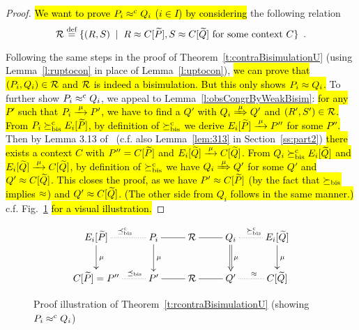 \begin{proof}
\hl{We want to prove $P_i \mathrel{\approx^{\rm{c}}} Q_i$ ($i \in I$) by considering}
the following relation
\begin{equation*}
{\cal R} \stackrel{\mbox{\scriptsize def}}{=} \{(R,S) \; \mid \; R \approx C [\widetilde P], S \approx C [\widetilde Q] \mbox{~for some context
$C$} \} \enspace.
\end{equation*}

Following the same steps in the proof of
Theorem~\ref{t:contraBisimulationU}
(using Lemma~\ref{l:ruptocon}
in place of Lemma~\ref{l:uptocon}), \hl{we can prove that $(P_i, Q_i)
\in{\cal R}$ and ${\cal R}$ is indeed a bisimulation. But this only shows $P_i \approx Q_i$.}
%
To further show $P_i \mathrel{\approx^{\rm{c}}} Q_i$, we appeal to
Lemma~\ref{l:obsCongrByWeakBisim}: \hl{for any $P'$ such that $P_i \arr{\mu} P'$, we have to
  find a $Q'$ with $Q_i \Arr{\mu} Q'$ and $(R',S') \in {\cal R}$.
%
From $P_i \mathrel{\succeq^{\rm{c}}_{\rm{bis}}} E_i[{\widetilde P}]$, by definition of $\mathrel{\succeq^{\rm{c}}_{\rm{bis}}}$ we derive $E_i[{\til P}] \arr{\mu}
P''$ for some $P''$.} Then by Lemma 3.13 of~\citep[p.~102]{Mil89}
(c.f. also Lemma~\ref{lem:313} in Section~\ref{ss:part2}) \hl{there exists
a context
$C$ with $P'' = C[{\widetilde P}]$ and $E_i[{\til Q}] \arr{\mu} C[{\til Q}]$.
From $Q_i \mathrel{\succeq^{\rm{c}}_{\rm{bis}}} E_i[{\widetilde Q}]$ and $E_i[{\til Q}] \arr{\mu} C[{\til
  Q}]$, by definition of $\mathrel{\succeq^{\rm{c}}_{\rm{bis}}}$ we have $Q_i \Arr{\mu} Q'$ for some
$Q'$ and $Q' \approx C[{\widetilde Q}]$. This closes the proof, as we have
$P' \approx C[{\widetilde P}]$ (by the fact that $\mathrel{\succeq_{\rm{bis}}}$ implies $\approx$) and
$Q' \approx C[{\widetilde Q}]$. (The other side from $Q_i$ follows in the same manner.)}
c.f. Fig.~\ref{fig:314} \hl{for a visual illustration.}
\end{proof}

\begin{figure}[ht]
\begin{displaymath}
  \xymatrix{
    {E_i[{\til P}]} \ar@{.}[r]^{\preceq^{\mathrm{c}}_{\mathrm{bis}}} \ar@{->}[d]^{\mu} & {P_i} \ar@{-}[r]
    \ar@{->}[d]^{\mu} & {\R} \ar@{-}[r] & {Q_i} \ar@{.}[r]^{\rcontr}
    \ar@{=>}[d]^{\mu} & {E_i[{\til Q}]} \ar@{->}[d]^{\mu} \\
    {C[{\til P}] = P''} \ar@{.}[r]^{\qquad\preceq_{\mathrm{bis}}} & {P'} \ar@{-}[r] & {\R} \ar@{-}[r] & {Q'} \ar@{.}[r]^{\wb} 
    & {C[{\til Q}]} \\
  }
\end{displaymath}
\caption{Proof illustration of Theorem~\ref{t:rcontraBisimulationU}
  (showing $P_i \mathrel{\approx^{\rm{c}}} Q_i$)}
\label{fig:314}
\end{figure}
